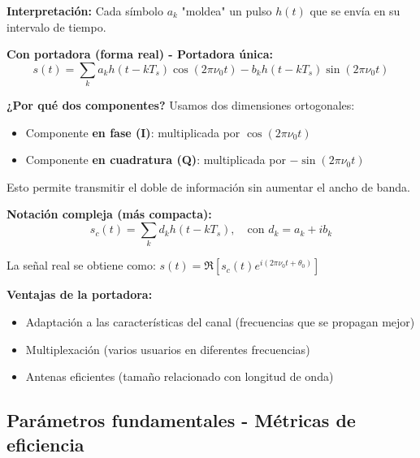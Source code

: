 \documentclass[10pt,a4paper]{article}
\begin{document}
\textbf{Interpretación:} Cada símbolo $a_k$ "moldea" un pulso $h(t)$ que se envía en su intervalo de tiempo.

\textbf{Con portadora (forma real) - Portadora única:}
$$s(t) = \sum_{k} a_k h(t-kT_s)\cos(2\pi\nu_0 t) - b_k h(t-kT_s)\sin(2\pi\nu_0 t)$$

\textbf{¿Por qué dos componentes?} Usamos dos dimensiones ortogonales:
\begin{itemize}
\item Componente \textbf{en fase (I)}: multiplicada por $\cos(2\pi\nu_0 t)$
\item Componente \textbf{en cuadratura (Q)}: multiplicada por $-\sin(2\pi\nu_0 t)$
\end{itemize}

Esto permite transmitir el doble de información sin aumentar el ancho de banda.

\textbf{Notación compleja (más compacta):}
$$s_c(t) = \sum_{k} d_k h(t-kT_s), \quad \text{con } d_k = a_k + ib_k$$

La señal real se obtiene como: $s(t) = \Re[s_c(t)e^{i(2\pi\nu_0 t + \theta_0)}]$

\textbf{Ventajas de la portadora:}
\begin{itemize}
\item Adaptación a las características del canal (frecuencias que se propagan mejor)
\item Multiplexación (varios usuarios en diferentes frecuencias)
\item Antenas eficientes (tamaño relacionado con longitud de onda)
\end{itemize}

\subsection{Parámetros fundamentales - Métricas de eficiencia}
\end{document}
